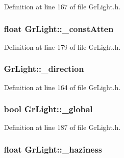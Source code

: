 Definition at line 167 of file GrLight.h.\hypertarget{class_gr_light_561e3666c6af8ff045d49e4b1b1d84cb}{
\subsubsection[{\_\-constAtten}]{\setlength{\rightskip}{0pt plus 5cm}float {\bf GrLight::\_\-constAtten}}}
\label{class_gr_light_561e3666c6af8ff045d49e4b1b1d84cb}




Definition at line 179 of file GrLight.h.\hypertarget{class_gr_light_3913d6edaa0a232aea68b9878fe75ca0}{
\subsubsection[{\_\-direction}]{ {\bf GrLight::\_\-direction}}}
\label{class_gr_light_3913d6edaa0a232aea68b9878fe75ca0}




Definition at line 164 of file GrLight.h.\hypertarget{class_gr_light_4e23b3f45bcd5f1a33352286db1effb9}{
\subsubsection[{\_\-global}]{\setlength{\rightskip}{0pt plus 5cm}bool {\bf GrLight::\_\-global}}}
\label{class_gr_light_4e23b3f45bcd5f1a33352286db1effb9}




Definition at line 187 of file GrLight.h.\hypertarget{class_gr_light_8afa1f0c0b67e9019c659ef97a840110}{
\subsubsection[{\_\-haziness}]{\setlength{\rightskip}{0pt plus 5cm}float {\bf GrLight::\_\-haziness}}}
\label{class_gr_light_8afa1f0c0b67e9019c659ef97a840110}




